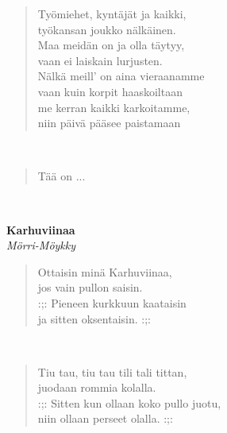 \noindent\begin{minipage}{\linewidth}
\begin{verse}
	Työmiehet, kyntäjät ja kaikki,\\
	työkansan joukko nälkäinen.\\
	Maa meidän on ja olla täytyy,\\
	vaan ei laiskain lurjusten.\\
	Nälkä meill' on aina vieraanamme\\
	vaan kuin korpit haaskoiltaan\\
	me kerran kaikki karkoitamme,\\
	niin päivä pääsee paistamaan\\
\end{verse}
\end{minipage}\\[10pt]
\noindent\begin{minipage}{\linewidth}
\begin{verse}
	Tää on ...\\
\end{verse}
\end{minipage}\\[10pt]
%
%
\noindent\begin{minipage}{\linewidth}
\vspace{5pt}
\parbox[t]{0.85\linewidth}{\raggedright {\large\bf Karhuviinaa}\\[2pt]\small\emph{Mörri-Möykky}\\[6pt]}
\begin{verse}
	
	Ottaisin minä Karhuviinaa,\\
	jos vain pullon saisin.\\
	:;: Pieneen kurkkuun kaataisin\\
	ja sitten oksentaisin. :;:\\
\end{verse}
\end{minipage}\\[10pt]
\noindent\begin{minipage}{\linewidth}
\begin{verse}
	Tiu tau, tiu tau tili tali tittan,\\
	juodaan rommia kolalla.\\
	:;: Sitten kun ollaan koko pullo juotu,\\
	niin ollaan perseet olalla. :;:\\
\end{verse}
\end{minipage}\\[10pt]
